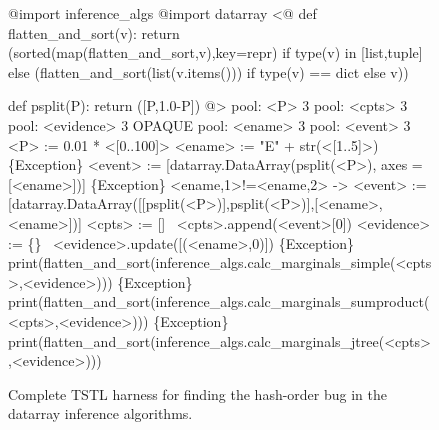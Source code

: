 \begin{figure*}
{\scriptsize
\begin{code}
@import inference\_algs
@import datarray
\vspace{0.1in}
<@
def flatten\_and\_sort(v):
    return (sorted(map(flatten\_and\_sort,v),key=repr) if type(v) in [list,tuple] else
                (flatten\_and\_sort(list(v.items())) if type(v) == dict else v))

def psplit(P):
    return ([P,1.0-P])
@>
\vspace{0.1in}
pool: <P> 3
pool: <cpts> 3
pool: <evidence> 3 OPAQUE
pool: <ename> 3
pool: <event> 3
\vspace{0.1in}
<P> := 0.01 * <[0..100]>
\vspace{0.1in}
<ename> := "E" + str(<[1..5]>)
\vspace{0.1in}
\{Exception\} <event> := [datarray.DataArray(psplit(<P>), axes = [<ename>])]
\{Exception\} <ename,1>!=<ename,2> -> <event> := [datarray.DataArray([[psplit(<P>)],psplit(<P>)],[<ename>,<ename>])]
\vspace{0.1in}
<cpts> := []
~<cpts>.append(<event>[0])
\vspace{0.1in}
<evidence> := \{\}
~<evidence>.update([(<ename>,0)])
\vspace{0.1in}
\{Exception\} print(flatten\_and\_sort(inference\_algs.calc\_marginals\_simple(<cpts>,<evidence>)))
\{Exception\} print(flatten\_and\_sort(inference\_algs.calc\_marginals\_sumproduct(<cpts>,<evidence>)))
\{Exception\} print(flatten\_and\_sort(inference\_algs.calc\_marginals\_jtree(<cpts>,<evidence>)))
\end{code}
}
\caption {Complete TSTL harness for finding the hash-order bug in the datarray
  inference algorithms.}
\label{hashbug}
\end{figure*}